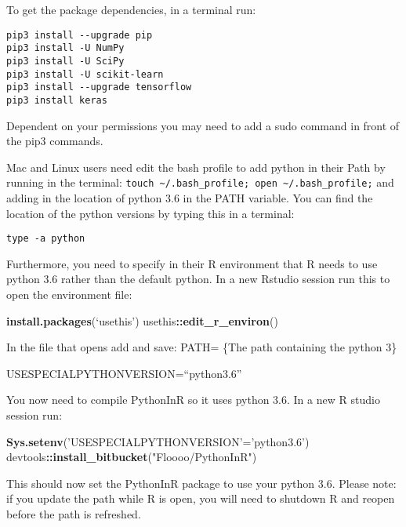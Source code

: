 \documentclass[]{article}
\newenvironment{Shaded}{\begin{snugshade}}{\end{snugshade}}
\newcommand{\KeywordTok}[1]{\textcolor[rgb]{0.13,0.29,0.53}{\textbf{#1}}}
\newcommand{\StringTok}[1]{\textcolor[rgb]{0.31,0.60,0.02}{#1}}
\newcommand{\OperatorTok}[1]{\textcolor[rgb]{0.81,0.36,0.00}{\textbf{#1}}}
\newcommand{\NormalTok}[1]{#1}
\begin{document}
To get the package dependencies, in a terminal run:

\begin{verbatim}
pip3 install --upgrade pip
pip3 install -U NumPy
pip3 install -U SciPy 
pip3 install -U scikit-learn
pip3 install --upgrade tensorflow 
pip3 install keras
\end{verbatim}

Dependent on your permissions you may need to add a sudo command in
front of the pip3 commands.

Mac and Linux users need edit the bash profile to add python in their
Path by running in the terminal:
\texttt{touch\ \textasciitilde{}/.bash\_profile;\ open\ \textasciitilde{}/.bash\_profile;}
and adding in the location of python 3.6 in the PATH variable. You can
find the location of the python versions by typing this in a terminal:

\begin{verbatim}
type -a python
\end{verbatim}

Furthermore, you need to specify in their R environment that R needs to
use python 3.6 rather than the default python. In a new Rstudio session
run this to open the environment file:

\begin{Shaded}
\begin{Highlighting}[]
\KeywordTok{install.packages}\NormalTok{(‘usethis’)}
\NormalTok{usethis}\OperatorTok{::}\KeywordTok{edit_r_environ}\NormalTok{()}
\end{Highlighting}
\end{Shaded}

In the file that opens add and save: PATH= \{The path containing the
python 3\}

USESPECIALPYTHONVERSION=``python3.6''

You now need to compile PythonInR so it uses python 3.6. In a new R
studio session run:

\begin{Shaded}
\begin{Highlighting}[]
\KeywordTok{Sys.setenv}\NormalTok{(}\StringTok{'USESPECIALPYTHONVERSION'}\NormalTok{=}\StringTok{'python3.6'}\NormalTok{)}
\NormalTok{devtools}\OperatorTok{::}\KeywordTok{install_bitbucket}\NormalTok{(}\StringTok{"Floooo/PythonInR"}\NormalTok{)}
\end{Highlighting}
\end{Shaded}

This should now set the PythonInR package to use your python 3.6. Please
note: if you update the path while R is open, you will need to shutdown
R and reopen before the path is refreshed.
\end{document}
